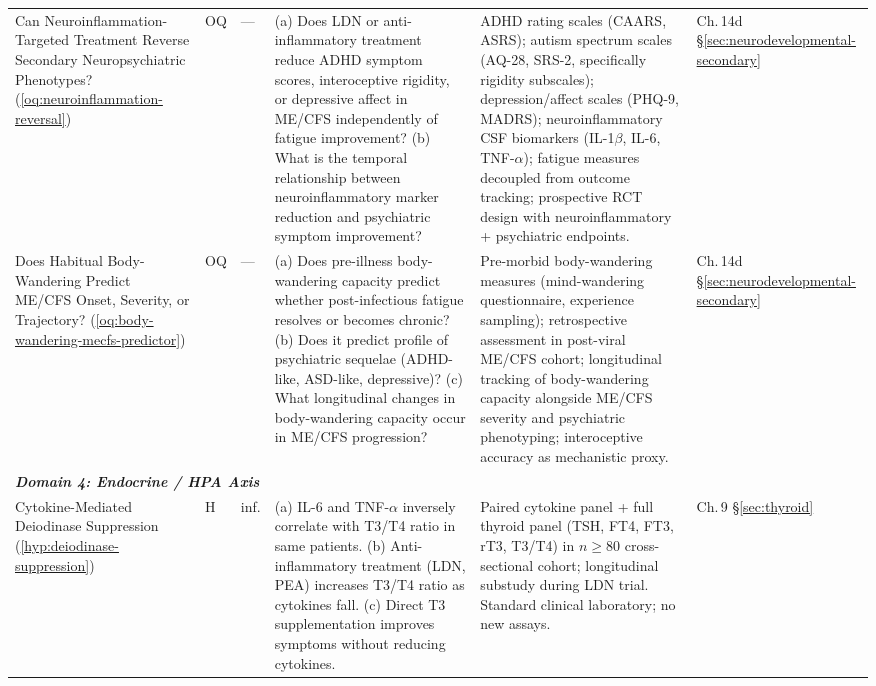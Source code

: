 \begin{longtable}{%
  p{3.0cm}
  >{\centering\arraybackslash}p{0.55cm}
  >{\centering\arraybackslash}p{1.0cm}
  p{3.8cm}
  p{3.8cm}
  p{2.2cm}
}
Can Neuroinflammation-Targeted Treatment Reverse Secondary Neuropsychiatric Phenotypes?
(\ref{oq:neuroinflammation-reversal})
&
OQ & ---
&
(a) Does LDN or anti-inflammatory treatment reduce ADHD symptom scores, interoceptive
rigidity, or depressive affect in ME/CFS independently of fatigue improvement?
(b) What is the temporal relationship between neuroinflammatory marker reduction
and psychiatric symptom improvement?
&
ADHD rating scales (CAARS, ASRS); autism spectrum scales (AQ-28, SRS-2, specifically
rigidity subscales); depression/affect scales (PHQ-9, MADRS); neuroinflammatory CSF
biomarkers (IL-1$\beta$, IL-6, TNF-$\alpha$); fatigue measures decoupled from outcome
tracking; prospective RCT design with neuroinflammatory + psychiatric endpoints.
&
Ch.\,14d \S\ref{sec:neurodevelopmental-secondary} \\[6pt]

Does Habitual Body-Wandering Predict ME/CFS Onset, Severity, or Trajectory?
(\ref{oq:body-wandering-mecfs-predictor})
&
OQ & ---
&
(a) Does pre-illness body-wandering capacity predict whether post-infectious
fatigue resolves or becomes chronic?
(b) Does it predict profile of psychiatric sequelae (ADHD-like, ASD-like, depressive)?
(c) What longitudinal changes in body-wandering capacity occur in ME/CFS progression?
&
Pre-morbid body-wandering measures (mind-wandering questionnaire, experience sampling);
retrospective assessment in post-viral ME/CFS cohort; longitudinal tracking of
body-wandering capacity alongside ME/CFS severity and psychiatric phenotyping;
interoceptive accuracy as mechanistic proxy.
&
Ch.\,14d \S\ref{sec:neurodevelopmental-secondary} \\[6pt]

\multicolumn{6}{l}{\small\textit{\textbf{Domain 4: Endocrine / HPA Axis}}} \\[2pt]

Cytokine-Mediated Deiodinase Suppression
(\ref{hyp:deiodinase-suppression})
&
H & inf.
&
(a) IL-6 and TNF-$\alpha$ inversely correlate with T3/T4 ratio in same patients.
(b) Anti-inflammatory treatment (LDN, PEA) increases T3/T4 ratio as cytokines fall.
(c) Direct T3 supplementation improves symptoms without reducing cytokines.
&
Paired cytokine panel + full thyroid panel (TSH, FT4, FT3, rT3, T3/T4) in
$n \geq 80$ cross-sectional cohort; longitudinal substudy during LDN trial.
Standard clinical laboratory; no new assays.
&
Ch.\,9 \S\ref{sec:thyroid} \\[6pt]


\end{longtable}
